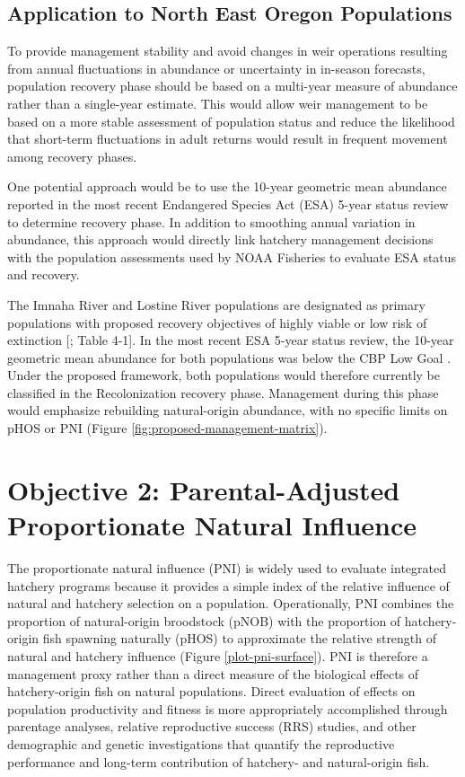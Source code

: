 \documentclass[12pt,letterpaper]{article}
\begin{document}
\subsection{Application to North East Oregon Populations}\label{application-to-north-east-oregon-populations}

To provide management stability and avoid changes in weir operations resulting from annual fluctuations in abundance or uncertainty in in-season forecasts, population recovery phase should be based on a multi-year measure of abundance rather than a single-year estimate. This would allow weir management to be based on a more stable assessment of population status and reduce the likelihood that short-term fluctuations in adult returns would result in frequent movement among recovery phases.

One potential approach would be to use the 10-year geometric mean abundance reported in the most recent Endangered Species Act (ESA) 5-year status review to determine recovery phase. In addition to smoothing annual variation in abundance, this approach would directly link hatchery management decisions with the population assessments used by NOAA Fisheries to evaluate ESA status and recovery.

The Imnaha River and Lostine River populations are designated as primary populations with proposed recovery objectives of highly viable or low risk of extinction {[}\textcite{noaa_esa_2017}; Table 4-1{]}. In the most recent ESA 5-year status review, the 10-year geometric mean abundance for both populations was below the CBP Low Goal \autocite{ford_biological_2022}. Under the proposed framework, both populations would therefore currently be classified in the Recolonization recovery phase. Management during this phase would emphasize rebuilding natural-origin abundance, with no specific limits on pHOS or PNI (Figure \ref{fig:proposed-management-matrix}).

\section{Objective 2: Parental-Adjusted Proportionate Natural Influence}\label{objective-2-parental-adjusted-proportionate-natural-influence}

The proportionate natural influence (PNI) is widely used to evaluate integrated hatchery programs because it provides a simple index of the relative influence of natural and hatchery selection on a population. Operationally, PNI combines the proportion of natural-origin broodstock (pNOB) with the proportion of hatchery-origin fish spawning naturally (pHOS) to approximate the relative strength of natural and hatchery influence (Figure \ref{plot-pni-surface}). PNI is therefore a management proxy rather than a direct measure of the biological effects of hatchery-origin fish on natural populations. Direct evaluation of effects on population productivity and fitness is more appropriately accomplished through parentage analyses, relative reproductive success (RRS) studies, and other demographic and genetic investigations that quantify the reproductive performance and long-term contribution of hatchery- and natural-origin fish.
\end{document}
